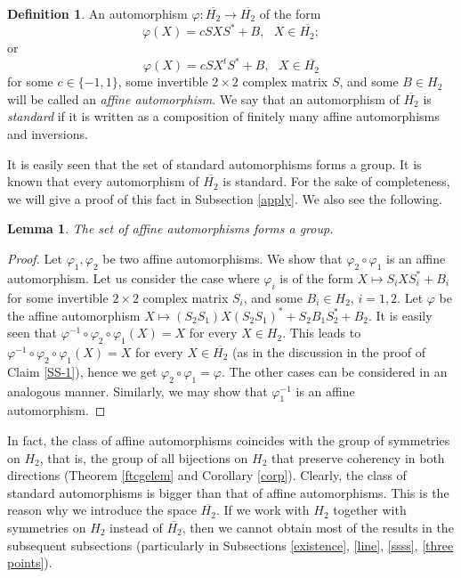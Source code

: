 \documentclass[10pt]{amsart}
\newtheorem{lemma}[theorem]{Lemma}
\theoremstyle{definition}
\newtheorem{definition}[theorem]{Definition}
\theoremstyle{remark}
\numberwithin{subsection}{section}
\numberwithin{equation}{section}
\newcommand\oH{{\overline{H_2}}}
\begin{document}
\begin{definition}\label{automorphisms}
An automorphism $\varphi\colon \oH\to \oH$ of the form
\[
\varphi (X) = c SXS^\ast + B, \ \ \ X \in \oH;
\]
or
\[
\varphi (X) = c SX^t S^\ast + B, \ \ \ X \in \oH
\]
for some $c \in \{-1 , 1 \}$, some invertible $2 \times 2$ complex matrix $S$, and some $B \in H_2$ will be called an \emph{affine automorphism}. 
We say that an automorphism of $\oH$ is \emph{standard}  if it is written as a composition of finitely many affine automorphisms and inversions.
\end{definition}
It is easily seen that the set of standard automorphisms forms a group.
It is known that every automorphism of $\oH$ is standard. 
For the sake of completeness, we will give a proof of this fact in Subsection \ref{apply}.
We also see the following. 

\begin{lemma}\label{simsim}
The set of affine automorphisms forms a group.
\end{lemma}
\begin{proof}
Let $\varphi_1, \varphi_2$ be two affine automorphisms. 
We show that $\varphi_2\circ \varphi_1$ is an affine automorphism. 
Let us consider the case where $\varphi_i$ is of the form $X\mapsto S_iXS_i^\ast + B_i$ for some invertible $2 \times 2$ complex matrix $S_i$, and some $B_i \in H_2$,  $i=1,2$. 
Let $\varphi$ be the affine automorphism $X\mapsto (S_2S_1)X(S_2S_1)^* + S_2B_1S_2^* +B_2$. 
It is easily seen that $\varphi^{-1}\circ \varphi_2\circ \varphi_1(X)=X$ for every $X\in H_2$. 
This leads to $\varphi^{-1}\circ \varphi_2\circ \varphi_1(X)=X$ for every $X\in \oH$ (as in the discussion in the proof of Claim \ref{SS-1}), hence we get $\varphi_2\circ \varphi_1=\varphi$. 
The other cases can be considered in an analogous manner. 
Similarly, we may show that $\varphi_1^{-1}$ is an affine automorphism.
\end{proof}

In fact, the class of affine automorphisms coincides with the group of symmetries on $H_2$, that is, the group of all bijections on $H_2$ that preserve coherency in both directions (Theorem \ref{ftcgelem} and Corollary \ref{corp}).
Clearly, the class of standard automorphisms is bigger than that of affine automorphisms. 
This is the reason why we introduce the space $\oH$. 
If we work with $H_2$ together with symmetries on $H_2$ instead of $\oH$, then we cannot obtain most of the results in the subsequent subsections (particularly in Subsections \ref{existence}, \ref{line}, \ref{ssss}, \ref{three points}).
\end{document}
